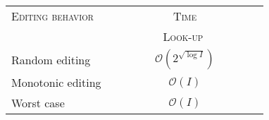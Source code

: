 
\begin{tabularx}{0.455\textwidth}{@{}Xc@{}}
  \toprule
  \textsc{Editing behavior} & \textsc{Time} \\
  & \ \ \ \ \ \ \ \ \ \textsc{Look-up} \ \ \ \ \ \ \ \ \ \\ \midrule
  Random editing & $\mathcal{O}(2^{\sqrt{\log I}})$ \\
  Monotonic editing & $\mathcal{O}(I)$ \\
  Worst case & $\mathcal{O}(I)$ \\ \bottomrule
\end{tabularx}

